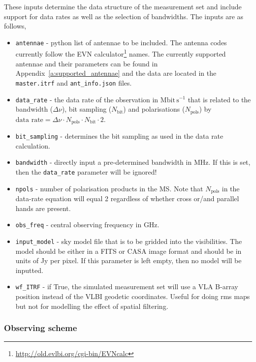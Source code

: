 \documentclass[11pt]{report_jfr}
\newcommand{\deff}{\fontfamily{lmss}\selectfont}
\begin{document}
These inputs determine the data structure of the measurement set and include support for data rates as well as the selection of bandwidths. The inputs are as follows,
%
\begin{itemize}
	\item \texttt{antennae} - python list of antennae to be included. The antenna codes currently follow the EVN calculator\footnote{\deff \href{http://old.evlbi.org/cgi-bin/EVNcalc}{http://old.evlbi.org/cgi-bin/EVNcalc}} names. The currently supported antennae and their parameters can be found in Appendix~\ref{a:supported_antennae} and the data are located in the \texttt{master.itrf} and \texttt{ant\_info.json} files. 
	\item \texttt{data\_rate} - the data rate of the observation in $\mathrm{Mbit\,s^{-1}}$ that is related to the bandwidth ($\Delta\nu$), bit sampling ($N_\mathrm{bit}$) and polarisations ($N_\mathrm{pols}$) by $\text{data rate} = \Delta\nu \cdot N_\mathrm{pols} \cdot N_\mathrm{bit}\cdot 2$. 
	\item \texttt{bit\_sampling} - determines the bit sampling as used in the data rate calculation.
	\item \texttt{bandwidth} - directly input a pre-determined bandwidth in MHz. If this is set, then the \texttt{data\_rate} parameter will be ignored!
	\item \texttt{npols} - number of polarisation products in the MS. Note that $N_\mathrm{pols}$ in the data-rate equation will equal 2 regardless of whether cross or/and parallel hands are present.
	\item \texttt{obs\_freq} - central observing frequency in GHz.
	\item \texttt{input\_model} - sky model file that is to be gridded into the visibilities. The model should be either in a FITS or CASA image format and should be in units of Jy per pixel. If this parameter is left empty, then no model will be inputted.
	\item \texttt{wf\_ITRF} - if True, the simulated measurement set will use a VLA B-array position instead of the VLBI geodetic coordinates. Useful for doing rms maps but not for modelling the effect of spatial filtering.
\end{itemize}

\subsubsection{Observing scheme}
\end{document}
